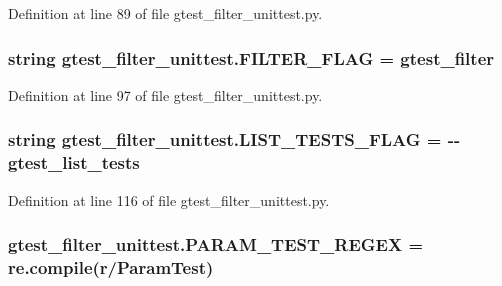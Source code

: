 Definition at line 89 of file gtest\+\_\+filter\+\_\+unittest.\+py.

\subsubsection[{\texorpdfstring{F\+I\+L\+T\+E\+R\+\_\+\+F\+L\+AG}{FILTER_FLAG}}]{\setlength{\rightskip}{0pt plus 5cm}string gtest\+\_\+filter\+\_\+unittest.\+F\+I\+L\+T\+E\+R\+\_\+\+F\+L\+AG = \textquotesingle{}gtest\+\_\+filter\textquotesingle{}}\hypertarget{namespacegtest__filter__unittest_a90fceef31e3329f712cd41244c5e923d}{}\label{namespacegtest__filter__unittest_a90fceef31e3329f712cd41244c5e923d}


Definition at line 97 of file gtest\+\_\+filter\+\_\+unittest.\+py.

\subsubsection[{\texorpdfstring{L\+I\+S\+T\+\_\+\+T\+E\+S\+T\+S\+\_\+\+F\+L\+AG}{LIST_TESTS_FLAG}}]{\setlength{\rightskip}{0pt plus 5cm}string gtest\+\_\+filter\+\_\+unittest.\+L\+I\+S\+T\+\_\+\+T\+E\+S\+T\+S\+\_\+\+F\+L\+AG = \textquotesingle{}-\/-\/gtest\+\_\+list\+\_\+tests\textquotesingle{}}\hypertarget{namespacegtest__filter__unittest_a9b3bb8eda9c6b1716e992d433b1e586c}{}\label{namespacegtest__filter__unittest_a9b3bb8eda9c6b1716e992d433b1e586c}


Definition at line 116 of file gtest\+\_\+filter\+\_\+unittest.\+py.

\subsubsection[{\texorpdfstring{P\+A\+R\+A\+M\+\_\+\+T\+E\+S\+T\+\_\+\+R\+E\+G\+EX}{PARAM_TEST_REGEX}}]{\setlength{\rightskip}{0pt plus 5cm}gtest\+\_\+filter\+\_\+unittest.\+P\+A\+R\+A\+M\+\_\+\+T\+E\+S\+T\+\_\+\+R\+E\+G\+EX = re.\+compile(r\textquotesingle{}/Param\+Test\textquotesingle{})}\hypertarget{namespacegtest__filter__unittest_a8fbf875f4ea83b2d5239a2e99e080526}{}\label{namespacegtest__filter__unittest_a8fbf875f4ea83b2d5239a2e99e080526}


